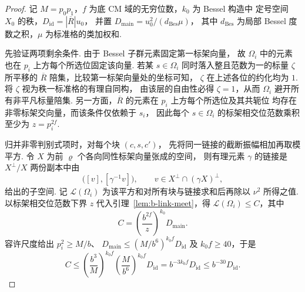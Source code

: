 \begin{proof}
记 $M=p_0p_1$，$f$ 为底 CM 域的无穷位数，$k_0$ 为 Bessel 构造中
定号空间 $X_0$ 的秩，$D_{\mathrm{id}}=|\overline R|u_0$，
并置 $D_{\mathrm{main}}=u_0^2/(d_{\mathrm{Bes}}\mu)$，
其中 $d_{\mathrm{Bes}}$ 为局部 Bessel 度数之积，$\mu$ 为标准格的类加权和.

先验证两项剩余条件. 由于 Bessel 子群元素固定第一标架向量，
故 $\Omega_i$ 中的元素也在 $p_i$ 上方每个所选位固定该向量.
若某 $s\in\Omega_i$ 同时落入整且范数为一的标量
$\zeta$ 所平移的 $\overline R$ 陪集，比较第一标架向量处的坐标可知，
$\zeta$ 在上述各位的约化均为 $1$.
将 $\zeta$ 视为秩一标准格的有理自同构，
由该层的自由性必得 $\zeta=1$，从而 $\Omega_i$ 避开所有非平凡标量陪集.
另一方面，$\overline R$ 的元素在 $p_i$ 上方每个所选位及其共轭位
均存在非零标架交向量，而该条件仅依赖于 $s_i$，
因此每个 $s\in\Omega_i$ 的标架相交位范数乘积至少为
$z=p_i^{2f}$.

归并非零判别式项时，对每个块 $(c,s,c')$，
先将同一链接的截断振幅相加再取模平方.
令 $X$ 为前 $\varrho$ 个各向同性标架向量张成的空间，
则有理元素 $\gamma$ 的链接是 $X^\perp/X$ 两份副本中由
\[
 \bigl([v],[\gamma^{-1}v]\bigr),\qquad v\in X^\perp\cap(\gamma X)^\perp,
\]
给出的子空间. 记 $\mathcal L(\Omega_i)$ 为该平方和对所有块与链接求和后再除以 $\nu^2$ 所得之值.
以标架相交位范数下界 $z$ 代入引理~\ref{lem:b-link-meet}，得
$\mathcal L(\Omega_i)\le C$，其中
\[
 C=\left(\frac{b^{2f}}{z}\right)^{k_0}D_{\mathrm{main}} .
\]
容许尺度给出 $p_i^2\ge M/b$、
$D_{\mathrm{main}}\le(M/b^6)^{k_0 f}D_{\mathrm{id}}$
及 $k_0 f\ge40$，于是
\[
 C\le\left(\frac{b^3}{M}\right)^{k_0 f}
        \left(\frac{M}{b^6}\right)^{k_0 f}D_{\mathrm{id}}
   =b^{-3k_0 f}D_{\mathrm{id}}
   \le b^{-30}D_{\mathrm{id}} .
\]


\end{proof}
